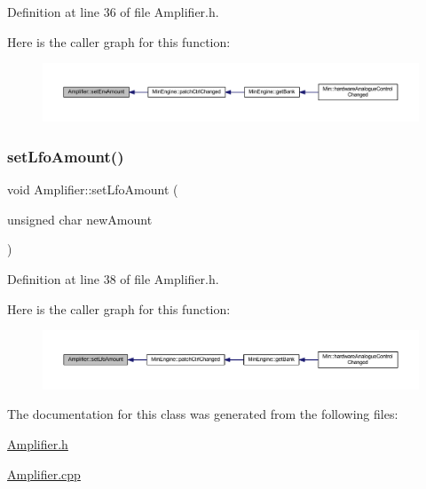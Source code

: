 Definition at line 36 of file Amplifier.\+h.

Here is the caller graph for this function\+:
\nopagebreak
\begin{figure}[H]
\begin{center}
\leavevmode
\includegraphics[width=350pt]{de/d01/class_amplifier_a1106605e158c9855d4e303e6972baf9f_icgraph}
\end{center}
\end{figure}
\mbox{\label{class_amplifier_a99593afade53ffadc6958861e38b612a}} 
\subsubsection{\texorpdfstring{set\+Lfo\+Amount()}{setLfoAmount()}}
{\footnotesize\ttfamily void Amplifier\+::set\+Lfo\+Amount (\begin{DoxyParamCaption}\item[{unsigned char}]{new\+Amount }\end{DoxyParamCaption})\hspace{0.3cm}{\ttfamily [inline]}}



Definition at line 38 of file Amplifier.\+h.

Here is the caller graph for this function\+:
\nopagebreak
\begin{figure}[H]
\begin{center}
\leavevmode
\includegraphics[width=350pt]{de/d01/class_amplifier_a99593afade53ffadc6958861e38b612a_icgraph}
\end{center}
\end{figure}


The documentation for this class was generated from the following files\+:\begin{DoxyCompactItemize}
\item 
\hyperlink{_amplifier_8h}{Amplifier.\+h}\item 
\hyperlink{_amplifier_8cpp}{Amplifier.\+cpp}\end{DoxyCompactItemize}
